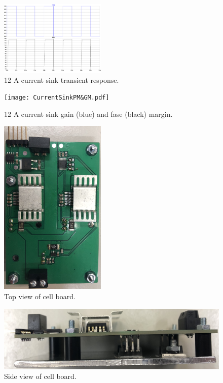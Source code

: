 \begin{figure}[ht!]
    \centering
    \includegraphics[width=0.45\textwidth]{CurrentSinkTransient.pdf}
    \caption{12 A current sink transient response.}
    \label{fig:CurrentSinkTransient}
\end{figure}

\begin{figure}[ht!]
    \centering
    \texttt{[image: CurrentSinkPM\&GM.pdf]}
    \caption{12 A current sink gain (blue) and fase (black) margin.}
    \label{fig:CurrentSinkPM&GM}
\end{figure}

\begin{figure}[ht!]
    \centering
    \includegraphics[width=0.45\textwidth]{CellBoardTop.jpg}
    \caption{Top view of cell board.}
    \label{fig:CellBoardTop}
\end{figure}

\begin{figure}[ht!]
    \centering
    \includegraphics[height=0.45\textwidth,angle=90,origin=c]{CellBoardSide.jpg}
    \caption{Side view of cell board.}
    \label{fig:CellBoardSide}
\end{figure}

